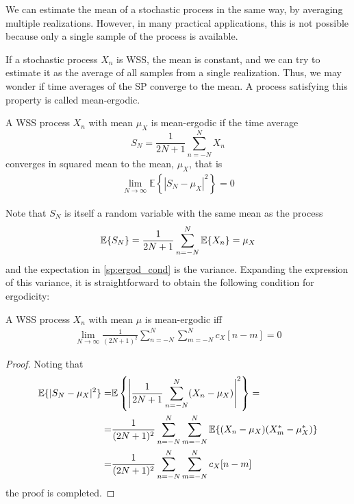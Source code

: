 We can estimate the mean of a stochastic process in the same way, by averaging multiple realizations. However, in many practical applications, this is not possible because only a single sample of the process is available.

If a stochastic process $X_n$ is WSS, the mean is constant, and we can try to estimate it as the average of all samples from a single realization. Thus, we may wonder if time averages of the SP converge to the mean. A process satisfying this property is called mean-ergodic.

\begin{definition}

A WSS process $X_n$ with mean $\mu_X$ is mean-ergodic if the time average
\begin{equation}
  S_N = \frac{1}{2N + 1} \sum_{n=-N}^N X_n
\end{equation}
converges in squared mean to the mean, $\mu_X$, that is
\begin{align}
\lim_{N \rightarrow \infty} \mathbb{E}\left\{\left| S_N - \mu_X \right|^2\right\} = 0
\label{sp:ergod_cond}
\end{align}

\end{definition}

Note that $S_N$ is itself a random variable with the same mean as the process
\begin{equation}
\mathbb{E}\{S_N\} = \frac{1}{2N+1} \sum_{n=-N}^N \mathbb{E}\{X_n\} = \mu{}_X
\end{equation}
and the expectation in \eqref{sp:ergod_cond} is the variance. Expanding the expression of this variance, it is straightforward to obtain the following condition for ergodicity:

\begin{theorem}

A WSS process $X_n$ with mean $\mu$ is mean-ergodic iff
\begin{align}
\lim_{N \rightarrow \infty} \frac{1}{(2N+1)^2} \sum_{n=-N}^N\sum_{m=-N}^N  c_X[n-m] = 0
\label{AverageVar0}
\end{align}

\end{theorem}

\begin{proof}

Noting that
\begin{align}
\mathbb{E}\{|S_N - \mu_X|^2\} 
    =& \mathbb{E}\left\{\left| \frac{1}{2N+1} \sum_{n=-N}^N (X_n-\mu_X) \right|^2 \right\} =                \nonumber\\
    =& \frac{1}{(2N+1)^2} \sum_{n=-N}^N \sum_{m=-N}^N \mathbb{E}\{(X_n-\mu_X)(X_m^*-\mu_X^*) \}  \nonumber\\
    =& \frac{1}{(2N+1)^2} \sum_{n=-N}^N \sum_{m=-N}^N  c_X[n-m]
\label{AverageVar1}
\end{align}
the proof is completed.
\end{proof}


